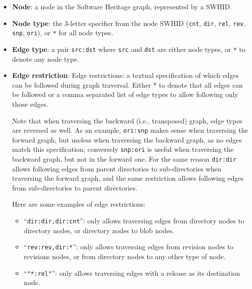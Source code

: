 \begin{itemize}
    \item \textbf{Node}: a node in the Software Heritage graph, represented by
        a \gls{SWHID}.
    \item \textbf{Node type}: the 3-letter specifier from the node \gls{SWHID}
        (\texttt{cnt}, \texttt{dir}, \texttt{rel}, \texttt{rev}, \texttt{snp},
        \texttt{ori}), or \texttt{*} for all node types.
    \item \textbf{Edge type}: a pair \texttt{src:dst} where \texttt{src} and
        \texttt{dst} are either node types, or \texttt{*} to denote any node
        type.
    \item \textbf{Edge restriction}: Edge restrictions: a textual specification
        of which edges can be followed during graph traversal. Either * to
        denote that all edges can be followed or a comma separated list of edge
        types to allow following only those edges.

        Note that when traversing the backward (i.e., transposed) graph, edge
        types are reversed as well. As an example, \texttt{ori:snp} makes
        sense when traversing the forward graph, but useless when traversing
        the backward graph, as no edges match this specification; conversely
        \texttt{snp:ori} is useful when traversing the backward graph, but not
        in the forward one. For the same reason \texttt{dir:dir} allows
        following edges from parent directories to sub-directories when
        traversing the forward graph, and the same restriction allows following
        edges from sub-directories to parent directories.

        Here are some examples of edge restrictions:

        \begin{itemize}
            \item ``\texttt{dir:dir,dir:cnt}'': only allows traversing edges
                from directory nodes to directory nodes, or directory nodes to
                blob nodes.

            \item ``\texttt{rev:rev,dir:*}'': only allows traversing edges from
                revision nodes to revisions nodes, or from directory nodes to
                any other type of node.

            \item ``\texttt{"*:rel"}'': only allows traversing edges with a
                release as its destination node.
        \end{itemize}
\end{itemize}

